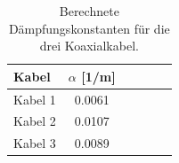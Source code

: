 \begin{table}[h!]
\centering
\begin{tabular}{lccccc}
    \toprule
    Kabel & $\alpha$ [1/m] \\
    \midrule
    Kabel 1 & \qty{0.0061}{} \\
    Kabel 2 & \qty{0.0107}{}\\
    Kabel 3 & \qty{0.0089}{} \\
    \bottomrule
\end{tabular}
\caption{Berechnete Dämpfungskonstanten für die drei Koaxialkabel.}
\label{tab:alpha}
\end{table}











